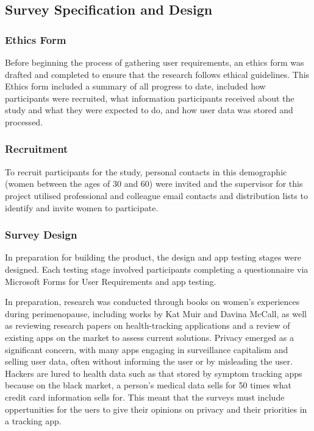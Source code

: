 \subsection{Survey Specification and Design}

\subsubsection{Ethics Form}
Before beginning the process of gathering user requirements, an ethics form was drafted and completed to ensure that the research follows ethical guidelines. This Ethics form included a summary of all progress to date, included how participants were recruited, what information participants received about the study and what they were expected to do, and how user data was stored and processed. 

\subsubsection{Recruitment}
To recruit participants for the study, personal contacts in this demographic (women between the ages of 30 and 60) were invited and the supervisor for this project utilised professional and colleague email contacts and distribution lists to identify and invite women to participate. 

\subsubsection{Survey Design}
In preparation for building the product, the design and app testing stages were designed. Each testing stage involved participants completing a questionnaire via Microsoft Forms for User Requirements and app testing. 

In preparation, research was conducted through books on women’s experiences during perimenopause, including works by Kat Muir\cite{Muir2022} and Davina McCall\cite{McCall2022}, as well as reviewing research papers on health-tracking applications and a review of existing apps on the market to assess current solutions. Privacy emerged as a significant concern, with many apps engaging in surveillance capitalism and selling user data, often without informing the user or by misleading the user\cite{Gilman_2021}\cite{FTC2021}. Hackers are lured to health data such as that stored by symptom tracking apps because on the black market, a person's medical data sells for 50 times what credit card information sells for\cite{Rosato2020}. This meant that the surveys must include oppertunities for the uers to give their opinions on privacy and their priorities in a tracking app.

